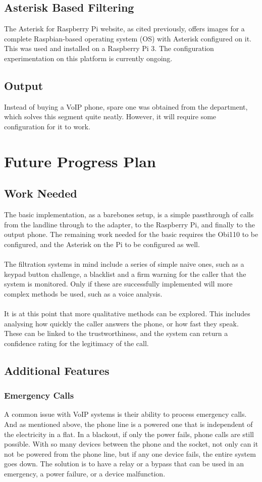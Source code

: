 \documentclass[main.tex]{subfiles}
\begin{document}
\subsection{Asterisk Based Filtering}
The Asterisk for Raspberry Pi website, as cited previously, offers images for a complete Raspbian-based operating system (OS) with Asterisk configured on it. This was used and installed on a Raspberry Pi 3. The configuration experimentation on this platform is currently ongoing.

\subsection{Output}
Instead of buying a VoIP phone, spare one was obtained from the department, which solves this segment quite neatly. However, it will require some configuration for it to work.

\section{Future Progress Plan}
\subsection{Work Needed}
The basic implementation, as a barebones setup, is a simple passthrough of calls from the landline through to the adapter, to the Raspberry Pi, and finally to the output phone. The remaining work needed for the basic requires the Obi110 to be configured, and the Asterisk on the Pi to be configured as well.
\\\\
The filtration systems in mind include a series of simple naive ones, such as a keypad button challenge, a blacklist and a firm warning for the caller that the system is monitored. Only if these are successfully implemented will more complex methods be used, such as a voice analysis.
\\\\
It is at this point that more qualitative methods can be explored. This includes analysing how quickly the caller answers the phone, or how fast they speak. These can be linked to the trustworthiness, and the system can return a confidence rating for the legitimacy of the call.

\subsection{Additional Features}
\subsubsection{Emergency Calls}
A common issue with VoIP systems is their ability to process emergency calls. And as mentioned above, the phone line is a powered one that is independent of the electricity in a flat. In a blackout, if only the power fails, phone calls are still possible. With so many devices between the phone and the socket, not only can it not be powered from the phone line, but if any one device fails, the entire system goes down. The solution is to have a relay or a bypass that can be used in an emergency, a power failure, or a device malfunction.
\end{document}
